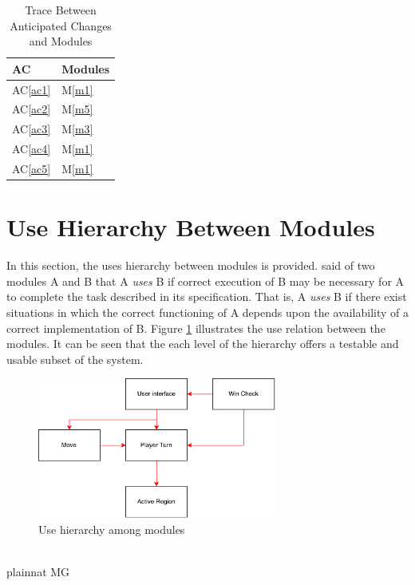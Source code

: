 \documentclass[12pt, titlepage]{article}
\newcommand{\acref}[1]{AC\ref{#1}}
\newcommand{\mref}[1]{M\ref{#1}}
\begin{document}
\begin{table}[H]
\centering
\begin{tabular}{p{} p{}}
\toprule
\textbf{AC} & \textbf{Modules}\\
\midrule
\acref{ac1} & \mref{m1}\\
\acref{ac2} & \mref{m5}\\
\acref{ac3} & \mref{m3}\\
\acref{ac4} & \mref{m1}\\
\acref{ac5} & \mref{m1}\\
\bottomrule
\end{tabular}
\caption{Trace Between Anticipated Changes and Modules}
\label{TblACT}
\end{table}

\section{Use Hierarchy Between Modules} \label{SecUse}

In this section, the uses hierarchy between modules is
provided. \citet{Parnas1978} said of two modules A and B that A {\em uses} B if
correct execution of B may be necessary for A to complete the task described in
its specification. That is, A {\em uses} B if there exist situations in which
the correct functioning of A depends upon the availability of a correct
implementation of B.  Figure \ref{FigUH} illustrates the use relation between
the modules. It can be seen that the each level of the hierarchy offers a testable
and usable subset of the system.

\begin{figure}[H]
\centering
\includegraphics[width=0.7\textwidth]{UseHierarchy_Diagram.pdf}
\caption{Use hierarchy among modules}
\label{FigUH}
\end{figure}
 \\


 {plainnat}
 {MG}
\end{document}
